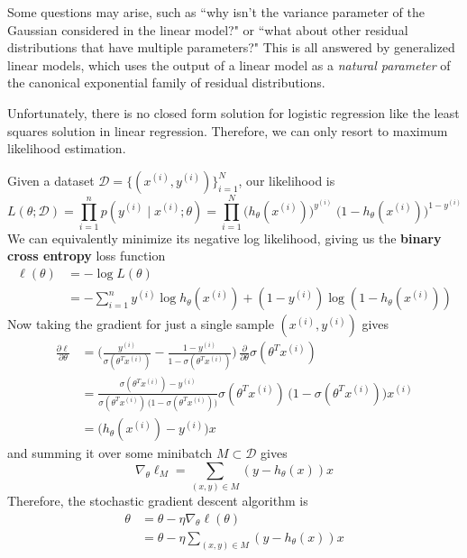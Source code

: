 \documentclass{article}
\begin{document}
    Some questions may arise, such as ``why isn't the variance parameter of the Gaussian considered in the linear model?" or ``what about other residual distributions that have multiple parameters?" This is all answered by generalized linear models, which uses the output of a linear model as a \textit{natural parameter} of the canonical exponential family of residual distributions. 

    Unfortunately, there is no closed form solution for logistic regression like the least squares solution in linear regression. Therefore, we can only resort to maximum likelihood estimation. 

    \begin{theorem}
      Given a dataset $\mathcal{D} = \{(x^{(i)}, y^{(i)})\}_{i=1}^N$, our likelihood is 
      \[L(\theta ; \mathcal{D}) = \prod_{i=1}^n p(y^{(i)} \;|\; x^{(i)} ; \theta) = \prod_{i=1}^N  \big( h_\theta (x^{(i)} )\big)^{y^{(i)}} \; \big( 1 - h_\theta (x^{(i)})\big)^{1-y^{(i)}}\]
      We can equivalently minimize its negative log likelihood, giving us the \textbf{binary cross entropy} loss function
      \begin{align*}
          \ell(\theta) & = -\log L(\theta) \\
          & = -\sum_{i=1}^n y^{(i)} \log h_\theta (x^{(i)}) + (1 - y^{(i)}) \log (1 - h_\theta (x^{(i)}))
      \end{align*}
      Now taking the gradient for just a single sample $(x^{(i)}, y^{(i)})$ gives 
      \begin{align*}
          \frac{\partial \ell}{\partial \theta}  & = \bigg( \frac{y^{(i)}}{\sigma(\theta^T x^{(i)})} - \frac{1 - y^{(i)}}{1 - \sigma(\theta^T x^{(i)})} \bigg) \, \frac{\partial}{\partial \theta} \sigma (\theta^T x^{(i)}) \\
          & = \frac{\sigma(\theta^T x^{(i)}) - y^{(i)}}{\sigma(\theta^T x^{(i)}) \, \big( 1 - \sigma(\theta^T x^{(i)}) \big)} \sigma(\theta^T x^{(i)}) \, \big( 1 - \sigma(\theta^T x^{(i)}) \big) x^{(i)} \\
          & = \big( h_\theta (x^{(i)}) - y^{(i)} \big) x
      \end{align*}
      and summing it over some minibatch $M \subset \mathcal{D}$ gives 
      \[\nabla_\theta \ell_M = \sum_{(x, y) \in M} (y - h_\theta(x)) x\]
      Therefore, the stochastic gradient descent algorithm is 
      \begin{align*}
          \theta & = \theta - \eta \nabla_\theta \ell (\theta) \\
          & = \theta - \eta \sum_{(x, y) \in M} (y - h_\theta(x)) x
      \end{align*}
    \end{theorem}
\end{document}

